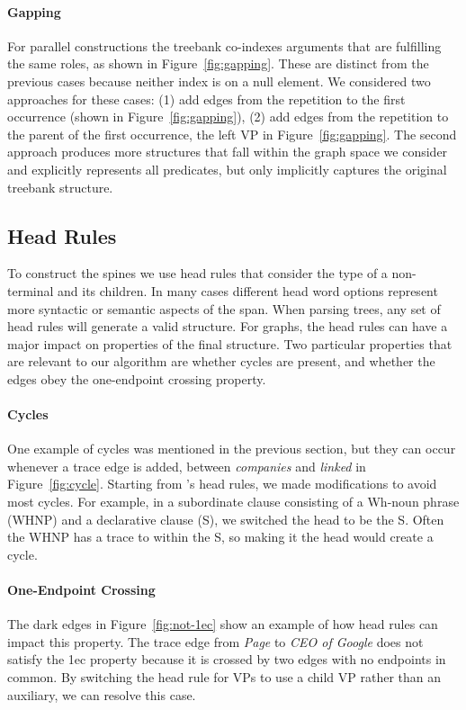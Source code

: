 \paragraph{Gapping}
For parallel constructions the treebank co-indexes arguments that are fulfilling the same roles, as shown in Figure~\ref{fig:gapping}.
These are distinct from the previous cases because neither index is on a null element.
We considered two approaches for these cases: (1) add edges from the repetition to the first occurrence (shown in Figure~\ref{fig:gapping}), (2) add edges from the repetition to the parent of the first occurrence, \myeg the left VP in Figure~\ref{fig:gapping}.
The second approach produces more structures that fall within the graph space we consider and explicitly represents all predicates, but only implicitly captures the original treebank structure.

\subsection{Head Rules} \label{sec:rep-head}

To construct the spines we use head rules that consider the type of a non-terminal and its children.
In many cases different head word options represent more syntactic or semantic aspects of the span.
When parsing trees, any set of head rules will generate a valid structure.
For graphs, the head rules can have a major impact on properties of the final structure.
Two particular properties that are relevant to our algorithm are whether cycles are present, and whether the edges obey the one-endpoint crossing property.

\paragraph{Cycles}
One example of cycles was mentioned in the previous section, but they can occur whenever a trace edge is added, \myeg between \emph{companies} and \emph{linked} in Figure~\ref{fig:cycle}.
Starting from \textcite{cck}'s head rules, we made modifications to avoid most cycles.
For example, in a subordinate clause consisting of a Wh-noun phrase (WHNP) and a declarative clause (S), we switched the head to be the S.
Often the WHNP has a trace to within the S, so making it the head would create a cycle.

\paragraph{One-Endpoint Crossing}
The dark edges in Figure~\ref{fig:not-1ec} show an example of how head rules can impact this property.
The trace edge from \emph{Page} to \emph{CEO of Google} does not satisfy the 1ec property because it is crossed by two edges with no endpoints in common.
By switching the head rule for VPs to use a child VP rather than an auxiliary, we can resolve this case.

